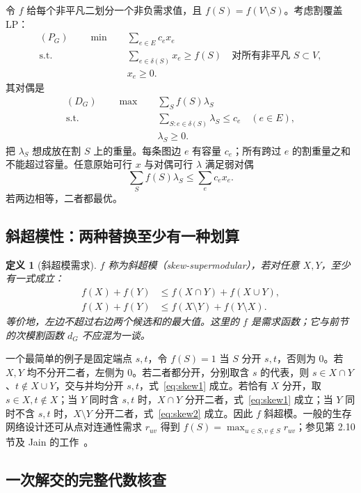 \documentclass[UTF8,11pt,a4paper]{ctexart}
\newtheorem{definition}{定义}[section]
\newcommand{\cut}{\delta}
\begin{document}
令 $f$ 给每个非平凡二划分一个非负需求值，且 $f(S)=f(V\setminus S)$。考虑割覆盖 LP：
\begin{align}
(P_G)\qquad\min\quad&\sum_{e\in E}c_ex_e\label{eq:primal}\\
\text{s.t.}\quad&\sum_{e\in\cut(S)}x_e\ge f(S)\quad\text{对所有非平凡 }S\subset V,\nonumber\\
&x_e\ge0.\nonumber
\end{align}
其对偶是
\begin{align}
(D_G)\qquad\max\quad&\sum_S f(S)\lambda_S\label{eq:dual}\\
\text{s.t.}\quad&\sum_{S:e\in\cut(S)}\lambda_S\le c_e\quad(e\in E),\nonumber\\
&\lambda_S\ge0.\nonumber
\end{align}
把 $\lambda_S$ 想成放在割 $S$ 上的重量。每条图边 $e$ 有容量 $c_e$；所有跨过 $e$ 的割重量之和不能超过容量。任意原始可行 $x$ 与对偶可行 $\lambda$ 满足弱对偶
\[
\sum_S f(S)\lambda_S\le \sum_e c_ex_e.
\]
若两边相等，二者都最优。

\subsection{斜超模性：两种替换至少有一种划算}

\begin{definition}[斜超模需求]
$f$ 称为\emph{斜超模}（skew-supermodular），若对任意 $X,Y$，至少有一式成立：
\begin{align}
f(X)+f(Y)&\le f(X\cap Y)+f(X\cup Y),\label{eq:skew1}\\
f(X)+f(Y)&\le f(X\setminus Y)+f(Y\setminus X).\label{eq:skew2}
\end{align}
等价地，左边不超过右边两个候选和的最大值。这里的 $f$ 是需求函数；它与前节的\emph{次模割函数} $d_G$ 不应混为一谈。
\end{definition}

一个最简单的例子是固定端点 $s,t$，令 $f(S)=1$ 当 $S$ 分开 $s,t$，否则为 $0$。若 $X,Y$ 均不分开二者，左侧为 $0$。若二者都分开，分别取含 $s$ 的代表，则 $s\in X\cap Y$、$t\notin X\cup Y$，交与并均分开 $s,t$，式~\eqref{eq:skew1} 成立。若恰有 $X$ 分开，取 $s\in X,t\notin X$；当 $Y$ 同时含 $s,t$ 时，$X\cap Y$ 分开二者，式~\eqref{eq:skew1} 成立；当 $Y$ 同时不含 $s,t$ 时，$X\setminus Y$ 分开二者，式~\eqref{eq:skew2} 成立。因此 $f$ 斜超模。一般的生存网络设计还可从点对连通性需求 $r_{uv}$ 得到 $f(S)=\max_{u\in S,v\notin S}r_{uv}$；参见第 2.10 节及 Jain 的工作~\cite{jain}。

\subsection{一次解交的完整代数核查}
\end{document}
